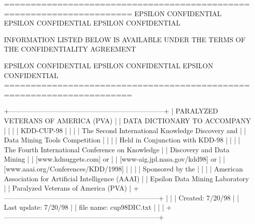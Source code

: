 \documentclass[
  11pt,
  a4paper,
  DIV=12,captions=tableheading,oneside,titlepage]{scrbook}
\let\oldverbatim\verbatim
\let\endoldverbatim\endverbatim
\renewenvironment{verbatim}{\footnotesize\oldverbatim}{\endoldverbatim}
\begin{document}
\begin{verbatim}
======================================================================
EPSILON CONFIDENTIAL      EPSILON CONFIDENTIAL    EPSILON CONFIDENTIAL

    INFORMATION LISTED BELOW IS AVAILABLE UNDER THE TERMS OF THE  
                      CONFIDENTIALITY AGREEMENT                

EPSILON CONFIDENTIAL      EPSILON CONFIDENTIAL    EPSILON CONFIDENTIAL
======================================================================

+--------------------------------------------------------------------+
|                PARALYZED VETERANS OF AMERICA (PVA)                 |
|                  DATA DICTIONARY TO ACCOMPANY                      |
|                                                                    |
|                          KDD-CUP-98                                |
|                                                                    |
|          The Second International Knowledge Discovery and          |
|                 Data Mining Tools Competition                      |
|                                                                    |
|                Held in Conjunction with KDD-98                     |
|                                                                    |
|          The Fourth International Conference on Knowledge          |
|                   Discovery and Data Mining                        |
|                    [www.kdnuggets.com] or                          |
|                 [www-aig.jpl.nasa.gov/kdd98] or                    |
|                [www.aaai.org/Conferences/KDD/1998]                 |
|                                                                    |
|                       Sponsored by the                             |
|                                                                    |
|      American Association for Artificial Intelligence (AAAI)       |
|                  Epsilon Data Mining Laboratory                    |
|                Paralyzed Veterans of America (PVA)                 |
+--------------------------------------------------------------------+
|                                                                    |
| Created:     7/20/98                                               |
| Last update: 7/20/98                                               |
| file name:   cup98DIC.txt                                          |
|                                                                    |
+--------------------------------------------------------------------+


\end{verbatim}
\end{document}
